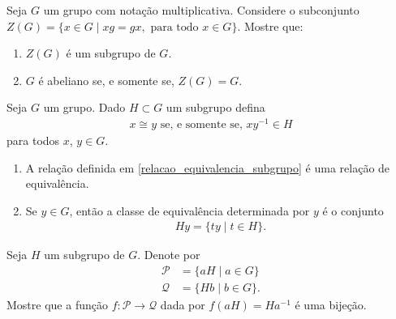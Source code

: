 \documentclass[12pt]{exam}
\begin{document}
    \vspace{.3cm}

    \questao{} Seja $G$ um grupo com nota\c{c}\~ao multiplicativa. Considere o subconjunto $Z(G) = \{x \in G \mid xg = gx, \mbox{ para todo } x \in G\}$. Mostre que:
    \begin{enumerate}[label=({\alph*})]
      \item $Z(G)$ \'e um subgrupo de $G$.
      \item $G$ \'e abeliano se, e somente se, $Z(G) = G$.
    \end{enumerate}

    \vspace{.3cm}

    \questao{} Seja $G$ um grupo. Dado $H \subset G$ um subgrupo defina
    \begin{align}\label{relacao_equivalencia_subgrupo}
        x \cong y \mbox{ se, e somente se, } xy^{-1} \in H
    \end{align}
    para todos $x$, $y \in G$.
    \begin{enumerate}[label={\roman*})]
        \item A rela\c{c}\~ao definida em \eqref{relacao_equivalencia_subgrupo} \'e uma rela\c{c}\~ao de equival\^encia.

        \item Se $y \in G$, ent\~ao a classe de equival\^encia determinada por $y$ \'e o conjunto
        \begin{align*}\label{classe_equivalencia_subgrupo}
            Hy = \{ty \mid t \in H\}.
        \end{align*}
    \end{enumerate}

    \vspace{.3cm}

    \questao{} Seja $H$ um subgrupo de $G$. Denote por
    \begin{align*}
        \mathcal{P} &= \{aH \mid a \in G\}\\
        \mathcal{Q} &= \{Hb \mid b \in G\}.
    \end{align*}
    Mostre que a função $f : \mathcal{P} \to \mathcal{Q}$ dada por $f(aH) = Ha^{-1}$ é uma bijeção.
\end{document}
